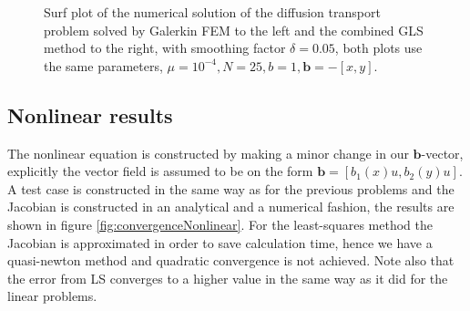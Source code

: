 \begin{figure}[h]
\begin{subfigure}[b]{0.48\textwidth}
  \end{subfigure}
  \vspace{-0.1\baselineskip}
	\caption{Surf plot of the numerical solution of the diffusion transport problem solved by Galerkin FEM to the left and the combined GLS method to the right, with smoothing factor $\delta = 0.05$, both plots use the same parameters, $\mu = 10^{-4},N=25,b = 1,\mathbf{b} = -[x,y]$.}
  \label{fig:SurfDiffTransPositiveFEM}
\end{figure}
%
\subsection{Nonlinear results}
The nonlinear equation is constructed by making a minor change in our $\mathbf{b}$-vector, explicitly the vector field is assumed to be on the form $\mathbf{b}=[b_1(x)u,b_2(y)u]$. A test case is constructed in the same way as for the previous problems and the Jacobian is constructed in an analytical and a numerical fashion, the results are shown in figure \ref{fig:convergenceNonlinear}. For the least-squares method the Jacobian is approximated in order to save calculation time, hence we have a quasi-newton method and quadratic convergence is not achieved. Note also that the error from LS converges to a higher value in the same way as it did for the linear problems. 
%
